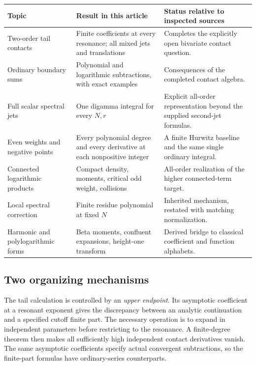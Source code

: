 \begin{center}
\small
\renewcommand{\arraystretch}{1.25}
\begin{tabular}{>{\raggedright\arraybackslash}p{}>{\raggedright\arraybackslash}p{}>{\raggedright\arraybackslash}p{}}
\toprule
Topic & Result in this article & Status relative to inspected sources\\
\midrule
Two-order tail contacts &
Finite coefficients at every resonance; all mixed jets and translations &
Completes the explicitly open bivariate contact question.\\
Ordinary boundary sums &
Polynomial and logarithmic subtractions, with exact examples &
Consequences of the completed contact algebra.\\
Full scalar spectral jets &
One digamma integral for every \(N,r\) &
Explicit all-order representation beyond the supplied second-jet formulas.\\
Even weights and negative points &
Every polynomial degree and every derivative at each nonpositive integer &
A finite Hurwitz baseline and the same single ordinary integral.\\
Connected logarithmic products &
Compact density, moments, critical odd weight, collisions &
All-order realization of the higher connected-term target.\\
Local spectral correction &
Finite residue polynomial at fixed \(N\) &
Inherited mechanism, restated with matching normalization.\\
Harmonic and polylogarithmic forms &
Beta moments, confluent expansions, height-one transform &
Derived bridge to classical coefficient and function alphabets.\\
\bottomrule
\end{tabular}
\end{center}

\subsection{Two organizing mechanisms}

The tail calculation is controlled by an \emph{upper endpoint}. Its
asymptotic coefficient at a resonant exponent gives the discrepancy between
an analytic continuation and a specified cutoff finite part. The necessary
operation is to expand in independent parameters before restricting to the
resonance. A finite-degree theorem then makes all sufficiently high
independent contact derivatives vanish. The same asymptotic coefficients
specify actual convergent subtractions, so the finite-part formulas have
ordinary-series counterparts.

